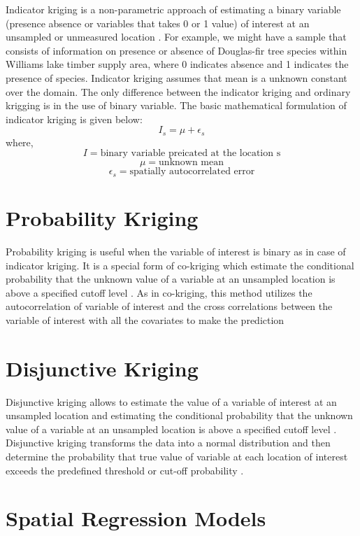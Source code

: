 \documentclass[
]{book}
\begin{document}
Indicator kriging is a non-parametric approach of estimating a binary variable (presence absence or variables that takes 0 or 1 value) of interest at an unsampled or unmeasured location \citep{Journel1983}. For example, we might have a sample that consists of information on presence or absence of Douglas-fir tree species within Williams lake timber supply area, where 0 indicates absence and 1 indicates the presence of species. Indicator kriging assumes that mean is a unknown constant over the domain. The only difference between the indicator kriging and ordinary krigging is in the use of binary variable. The basic mathematical formulation of indicator kriging is given below:
\[I_{s}= \mu + \epsilon_{s}\]
where, \[I= \text{binary variable preicated at the location s}\]
\[\mu= \text{unknown mean}\]
\[\epsilon_{s}=\text{spatially autocorrelated error}\]

\hypertarget{probability-kriging}{%
\section{Probability Kriging}\label{probability-kriging}}

Probability kriging is useful when the variable of interest is binary as in case of indicator kriging. It is a special form of co-kriging which estimate the conditional probability that the unknown value of a variable at an unsampled location is above a specified cutoff level \citep{Carr1993}. As in co-kriging, this method utilizes the autocorrelation of variable of interest and the cross correlations between the variable of interest with all the covariates to make the prediction \citep{Carr1993}

\hypertarget{disjunctive-kriging}{%
\section{Disjunctive Kriging}\label{disjunctive-kriging}}

Disjunctive kriging allows to estimate the value of a variable of interest at an unsampled location and estimating the conditional probability that the unknown value of a variable at an unsampled location is above a specified cutoff level \citep{Yates1986}. Disjunctive kriging transforms the data into a normal distribution and then determine the probability that true value of variable at each location of interest exceeds the predefined threshold or cut-off probability \citep{Daya2015}.

\hypertarget{spatial-regression-models}{%
\section{Spatial Regression Models}\label{spatial-regression-models}}
\end{document}
